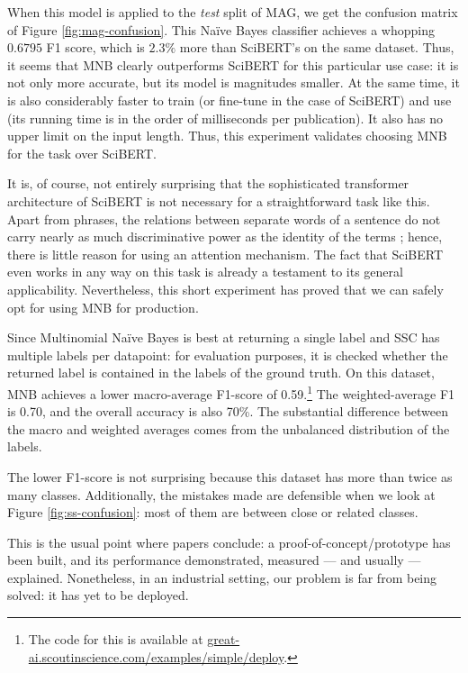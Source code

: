 When this model is applied to the \textit{test} split of MAG, we get the confusion matrix of Figure \ref{fig:mag-confusion}. This Naïve Bayes classifier achieves a whopping $0.6795$ F1 score, which is $2.3\%$ more than SciBERT's on the same dataset. Thus, it seems that MNB clearly outperforms SciBERT for this particular use case: it is not only more accurate, but its model is magnitudes smaller. At the same time, it is also considerably faster to train (or fine-tune in the case of SciBERT) and use (its running time is in the order of milliseconds per publication). It also has no upper limit on the input length. Thus, this experiment validates choosing MNB for the task over SciBERT.

It is, of course, not entirely surprising that the sophisticated transformer architecture of SciBERT is not necessary for a straightforward task like this. Apart from phrases, the relations between separate words of a sentence do not carry nearly as much discriminative power as the identity of the terms \cite{hand2001idiot}; hence, there is little reason for using an attention mechanism. The fact that SciBERT even works in any way on this task is already a testament to its general applicability. Nevertheless, this short experiment has proved that we can safely opt for using MNB for production.

Since Multinomial Naïve Bayes is best at returning a single label and SSC has multiple labels per datapoint: for evaluation purposes, it is checked whether the returned label is contained in the labels of the ground truth. On this dataset, MNB achieves a lower macro-average F1-score of 0.59.\footnote{The code for this is available at \href{https://great-ai.scoutinscience.com/examples/simple/deploy}{great-ai.scoutinscience.com/examples/simple/deploy}.} The weighted-average F1 is 0.70, and the overall accuracy is also 70\%. The substantial difference between the macro and weighted averages comes from the unbalanced distribution of the labels.

The lower F1-score is not surprising because this dataset has more than twice as many classes. Additionally, the mistakes made are defensible when we look at Figure \ref{fig:ss-confusion}: most of them are between close or related classes.

\begin{displayquote}
This is the usual point where papers conclude: a proof-of-concept/prototype has been built, and its performance demonstrated, measured --- and usually --- explained. Nonetheless, in an industrial setting, our problem is far from being solved: it has yet to be deployed.
\end{displayquote}

